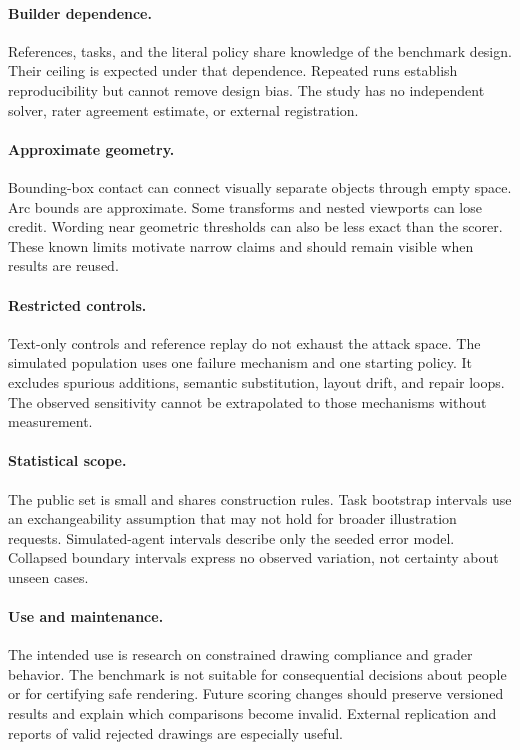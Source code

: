 \documentclass{article}
\begin{document}
\paragraph{Builder dependence.} References, tasks, and the literal policy share knowledge of the benchmark design. Their ceiling is expected under that dependence. Repeated runs establish reproducibility but cannot remove design bias. The study has no independent solver, rater agreement estimate, or external registration.
\paragraph{Approximate geometry.} Bounding-box contact can connect visually separate objects through empty space. Arc bounds are approximate. Some transforms and nested viewports can lose credit. Wording near geometric thresholds can also be less exact than the scorer. These known limits motivate narrow claims and should remain visible when results are reused.
\paragraph{Restricted controls.} Text-only controls and reference replay do not exhaust the attack space. The simulated population uses one failure mechanism and one starting policy. It excludes spurious additions, semantic substitution, layout drift, and repair loops. The observed sensitivity cannot be extrapolated to those mechanisms without measurement.
\paragraph{Statistical scope.} The public set is small and shares construction rules. Task bootstrap intervals use an exchangeability assumption that may not hold for broader illustration requests. Simulated-agent intervals describe only the seeded error model. Collapsed boundary intervals express no observed variation, not certainty about unseen cases.
\paragraph{Use and maintenance.} The intended use is research on constrained drawing compliance and grader behavior. The benchmark is not suitable for consequential decisions about people or for certifying safe rendering. Future scoring changes should preserve versioned results and explain which comparisons become invalid. External replication and reports of valid rejected drawings are especially useful.
\end{document}
